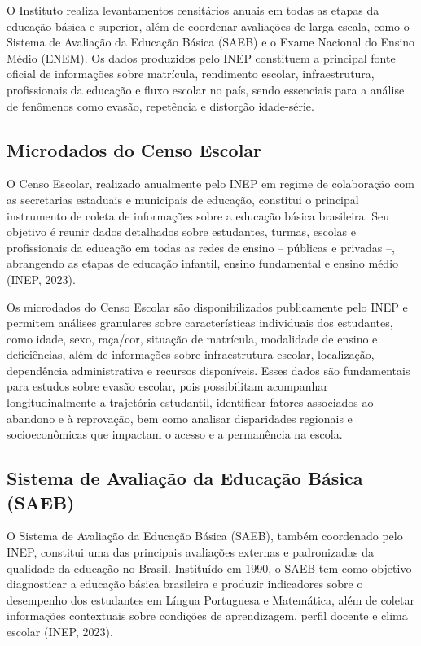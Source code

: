 \documentclass[english, spanish, brazilian]{RBIEarticle} %
\begin{document}
O Instituto realiza levantamentos censitários anuais em todas as etapas da educação básica e superior, além de coordenar avaliações de larga escala, como o Sistema de Avaliação da Educação Básica (SAEB) e o Exame Nacional do Ensino Médio (ENEM). Os dados produzidos pelo INEP constituem a principal fonte oficial de informações sobre matrícula, rendimento escolar, infraestrutura, profissionais da educação e fluxo escolar no país, sendo essenciais para a análise de fenômenos como evasão, repetência e distorção idade-série.

\subsection{Microdados do Censo Escolar}
O Censo Escolar, realizado anualmente pelo INEP em regime de colaboração com as secretarias estaduais e municipais de educação, constitui o principal instrumento de coleta de informações sobre a educação básica brasileira. Seu objetivo é reunir dados detalhados sobre estudantes, turmas, escolas e profissionais da educação em todas as redes de ensino – públicas e privadas –, abrangendo as etapas de educação infantil, ensino fundamental e ensino médio (INEP, 2023).

Os microdados do Censo Escolar são disponibilizados publicamente pelo INEP e permitem análises granulares sobre características individuais dos estudantes, como idade, sexo, raça/cor, situação de matrícula, modalidade de ensino e deficiências, além de informações sobre infraestrutura escolar, localização, dependência administrativa e recursos disponíveis. Esses dados são fundamentais para estudos sobre evasão escolar, pois possibilitam acompanhar longitudinalmente a trajetória estudantil, identificar fatores associados ao abandono e à reprovação, bem como analisar disparidades regionais e socioeconômicas que impactam o acesso e a permanência na escola.

\subsection{Sistema de Avaliação da Educação Básica (SAEB)}
O Sistema de Avaliação da Educação Básica (SAEB), também coordenado pelo INEP, constitui uma das principais avaliações externas e padronizadas da qualidade da educação no Brasil. Instituído em 1990, o SAEB tem como objetivo diagnosticar a educação básica brasileira e produzir indicadores sobre o desempenho dos estudantes em Língua Portuguesa e Matemática, além de coletar informações contextuais sobre condições de aprendizagem, perfil docente e clima escolar (INEP, 2023).
\end{document}

